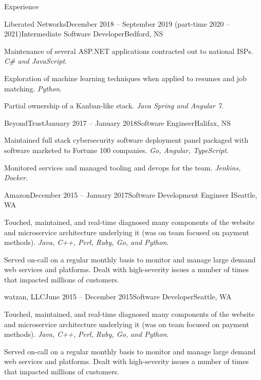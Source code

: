 \documentclass{resume} %
\begin{document}

\begin{rSection}{Experience}

\begin{rSubsection}{Liberated Networks}{December 2018 -- September 2019 (part-time 2020 -- 2021)}{Intermediate Software Developer}{Bedford, NS}
\item Maintenance of several ASP.NET applications contracted out to national ISPs. \textit{C\# and JavaScript}.
\item Exploration of machine learning techniques when applied to resumes and job matching. \textit{Python}.
\item Partial ownership of a Kanban-like stack. \textit{Java Spring and Angular 7}.
\end{rSubsection}

\begin{rSubsection}{BeyondTrust}{January 2017 -- January 2018}{Software Engineer}{Halifax, NS}
\item Maintained full stack cybersecurity software deployment panel packaged with software marketed to Fortune 100 companies. \textit{Go, Angular, TypeScript}.
\item Monitored services and managed tooling and devops for the team. \textit{Jenkins, Docker}.  
\end{rSubsection}


\begin{rSubsection}{Amazon}{December 2015 -- January 2017}{Software Development Engineer I}{Seattle, WA}
\item Touched, maintained, and real-time diagnosed many components of the website and microservice architecture underlying it (was on team focused on payment methods). \textit{Java, C++, Perl, Ruby, Go, and Python}.
\item Served on-call on a regular monthly basis to monitor and manage large demand web services and platforms. Dealt with high-severity issues a number of times that impacted millions of customers.
\end{rSubsection}


\begin{rSubsection}{watzan, LLC}{June 2015 -- December 2015}{Software Developer}{Seattle, WA}
\item Touched, maintained, and real-time diagnosed many components of the website and microservice architecture underlying it (was on team focused on payment methods). \textit{Java, C++, Perl, Ruby, Go, and Python}.
\item Served on-call on a regular monthly basis to monitor and manage large demand web services and platforms. Dealt with high-severity issues a number of times that impacted millions of customers.
\end{rSubsection}

\end{rSection}
\end{document}
